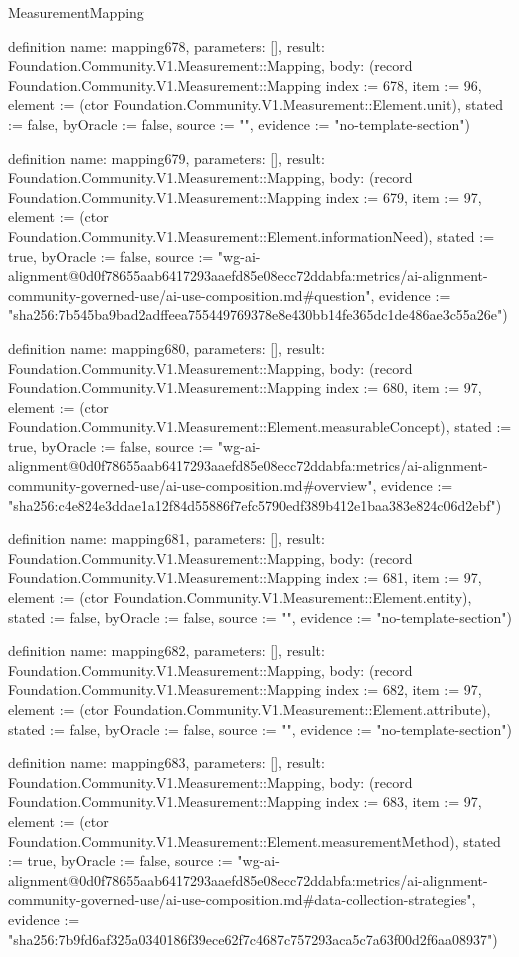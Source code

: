 \begin{lexlean}{MeasurementMapping}
\begin{semanticmodule}
definition{
  name: mapping678,
  parameters: [],
  result: Foundation.Community.V1.Measurement::Mapping,
  body: (record Foundation.Community.V1.Measurement::Mapping {index := 678, item := 96, element := (ctor Foundation.Community.V1.Measurement::Element.unit), stated := false, byOracle := false, source := "", evidence := "no-template-section"})
}

definition{
  name: mapping679,
  parameters: [],
  result: Foundation.Community.V1.Measurement::Mapping,
  body: (record Foundation.Community.V1.Measurement::Mapping {index := 679, item := 97, element := (ctor Foundation.Community.V1.Measurement::Element.informationNeed), stated := true, byOracle := false, source := "wg-ai-alignment@0d0f78655aab6417293aaefd85e08ecc72ddabfa:metrics/ai-alignment-community-governed-use/ai-use-composition.md#question", evidence := "sha256:7b545ba9bad2adffeea755449769378e8e430bb14fe365dc1de486ae3c55a26e"})
}

definition{
  name: mapping680,
  parameters: [],
  result: Foundation.Community.V1.Measurement::Mapping,
  body: (record Foundation.Community.V1.Measurement::Mapping {index := 680, item := 97, element := (ctor Foundation.Community.V1.Measurement::Element.measurableConcept), stated := true, byOracle := false, source := "wg-ai-alignment@0d0f78655aab6417293aaefd85e08ecc72ddabfa:metrics/ai-alignment-community-governed-use/ai-use-composition.md#overview", evidence := "sha256:c4e824e3ddae1a12f84d55886f7efc5790edf389b412e1baa383e824c06d2ebf"})
}

definition{
  name: mapping681,
  parameters: [],
  result: Foundation.Community.V1.Measurement::Mapping,
  body: (record Foundation.Community.V1.Measurement::Mapping {index := 681, item := 97, element := (ctor Foundation.Community.V1.Measurement::Element.entity), stated := false, byOracle := false, source := "", evidence := "no-template-section"})
}

definition{
  name: mapping682,
  parameters: [],
  result: Foundation.Community.V1.Measurement::Mapping,
  body: (record Foundation.Community.V1.Measurement::Mapping {index := 682, item := 97, element := (ctor Foundation.Community.V1.Measurement::Element.attribute), stated := false, byOracle := false, source := "", evidence := "no-template-section"})
}

definition{
  name: mapping683,
  parameters: [],
  result: Foundation.Community.V1.Measurement::Mapping,
  body: (record Foundation.Community.V1.Measurement::Mapping {index := 683, item := 97, element := (ctor Foundation.Community.V1.Measurement::Element.measurementMethod), stated := true, byOracle := false, source := "wg-ai-alignment@0d0f78655aab6417293aaefd85e08ecc72ddabfa:metrics/ai-alignment-community-governed-use/ai-use-composition.md#data-collection-strategies", evidence := "sha256:7b9fd6af325a0340186f39ece62f7c4687c757293aca5c7a63f00d2f6aa08937"})
}


\end{semanticmodule}
\end{lexlean}
